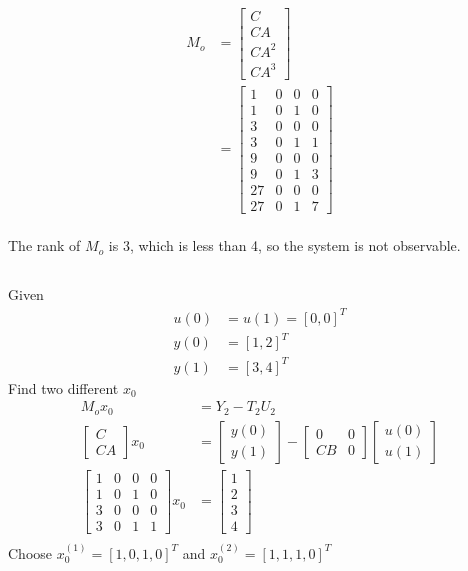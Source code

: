 \documentclass{article}
\begin{document}
\subsection{}
\begin{align*}
    M_o&=
    \begin{bmatrix}
        C\\CA\\CA^2\\CA^3
    \end{bmatrix}\\
    &=
    \begin{bmatrix}
        1&0&0&0\\
        1&0&1&0\\
        3&0&0&0\\
        3&0&1&1\\
        9&0&0&0\\
        9&0&1&3\\
       27&0&0&0\\
       27&0&1&7
    \end{bmatrix}
\end{align*}
\\
The rank of $M_o$ is 3, which is less than 4, so the system is not observable.\\
\subsection{}
Given
\begin{align*}
    u(0)&=u(1)=[0,0]^T\\
    y(0)&=[1,2]^T\\
    y(1)&=[3,4]^T
\end{align*}
Find two different $x_0$
\begin{align*}
    M_ox_0&=Y_2-T_2U_2\\
    \begin{bmatrix}
        C\\CA
    \end{bmatrix}
    x_0
    &=
    \begin{bmatrix}
        y(0)\\y(1)
    \end{bmatrix}
    -
    \begin{bmatrix}
        0&0\\CB&0
    \end{bmatrix}
    \begin{bmatrix}
        u(0)\\u(1)
    \end{bmatrix}\\
    \begin{bmatrix}
        1&0&0&0\\
        1&0&1&0\\
        3&0&0&0\\
        3&0&1&1
    \end{bmatrix}
    x_0&=
    \begin{bmatrix}
        1\\2\\3\\4
    \end{bmatrix}\\
\end{align*}
Choose $x_0^{(1)}=[1,0,1,0]^T$ and $x_0^{(2)}=[1,1,1,0]^T$
\end{document}
